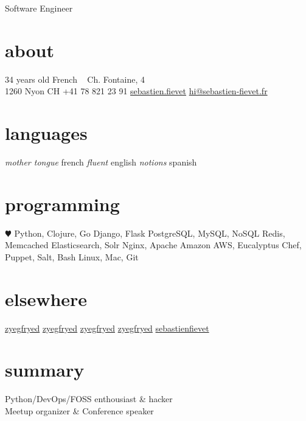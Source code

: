 \documentclass[]{friggeri}
\begin{document}
       {Software Engineer}

\begin{acronym}
\end{acronym}

\begin{aside}
  \section{about}
    34 years old
    French
    ~
    {\FA \faHome} Ch. Fontaine, 4\\1260 Nyon CH
    {\FA \faPhone} +41 78 821 23 91
    \href{skype:sebastienfievet?call}{{\FA \faSkype} sebastien.fievet}
    {\FA \faEnvelope} \href{mailto:hi@sebastien-fievet.fr}{hi@sebastien-fievet.fr}
  \section{languages}
    \emph{mother tongue} french
    \emph{fluent} english
    \emph{notions} spanish
  \section{programming}
    {\color{red} $\varheartsuit$} Python, Clojure, Go
    Django, Flask
    PostgreSQL, MySQL, NoSQL
    Redis, Memcached
    Elasticsearch, Solr
    Nginx, Apache
    Amazon AWS, Eucalyptus
    Chef, Puppet, Salt, Bash
    Linux, Mac, Git
  \section{elsewhere}
    \href{https://twitter.com/zyegfryed}{{\FA \faTwitter} zyegfryed}
    \href{https://github.com/zyegfryed}{{\FA \faGithub} zyegfryed}
    \href{https://bitbucket.org/zyegfryed}{{\FA \faBitbucket} zyegfryed}
    \href{https://speakerdeck.com/zyegfryed}{{\FA \faBullhorn} zyegfryed}
    \href{http://www.linkedin.com/in/sebastienfievet}{{\FA \faLinkedin} sebastienfievet}
\end{aside}

\section{summary}

Python/DevOps/FOSS enthousiast \& hacker\\
Meetup organizer \& Conference speaker
\end{document}
